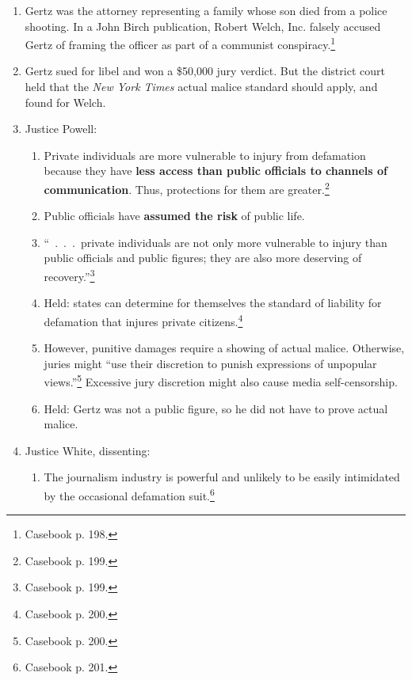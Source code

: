 \begin{enumerate}
    \item Gertz was the attorney representing a family whose son died from a 
    police shooting. In a John Birch publication, Robert Welch, Inc. falsely 
    accused Gertz of framing the officer as part of a communist 
    conspiracy.\footnote{Casebook p. 198.}
    \item Gertz sued for libel and won a \$50,000 jury verdict. But the district 
    court held that the \emph{New York Times} actual malice standard should 
    apply, and found for Welch.
    \item Justice Powell:
    \begin{enumerate}
        \item Private individuals are more vulnerable to injury from defamation 
        because they have \textbf{less access than public officials to channels 
        of communication}. Thus, protections for them are 
        greater.\footnote{Casebook p. 199.}
        \item Public officials have \textbf{assumed the risk} of public life.
        \item ``~.~.~.~private individuals are not only more vulnerable to 
        injury than public officials and public figures; they are also more 
        deserving of recovery.''\footnote{Casebook p. 199.}
        \item Held: states can determine for themselves the standard of 
        liability for defamation that injures private 
        citizens.\footnote{Casebook p. 200.}
        \item However, punitive damages require a showing of actual malice.  
        Otherwise, juries might ``use their discretion to punish expressions of 
        unpopular views.''\footnote{Casebook p. 200.} Excessive jury discretion 
        might also cause media self-censorship.
        \item Held: Gertz was not a public figure, so he did not have to prove 
        actual malice.
    \end{enumerate}
    \item Justice White, dissenting:
    \begin{enumerate}
        \item The journalism industry is powerful and unlikely to be easily 
        intimidated by the occasional defamation suit.\footnote{Casebook p.  
        201.}
    \end{enumerate}
\end{enumerate}

